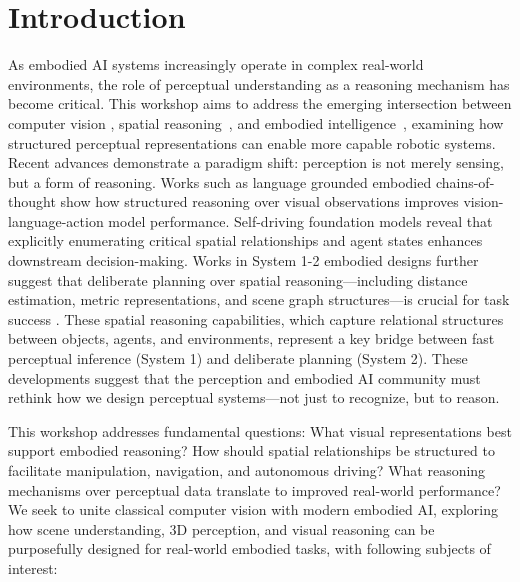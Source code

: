 \documentclass[runningheads]{llncs}
\begin{document}
\vspace{-1em}


\vspace{-1em}

\section{Introduction}

\vspace{-1em}
As embodied AI systems increasingly operate in complex real-world environments, the role of perceptual understanding as a reasoning mechanism has become critical. This workshop aims to address the emerging intersection between computer vision \cite{radford2021learning,liu2024grounding,simeoni2025dinov3,carion2025sam,chen2025sam}, spatial reasoning~\cite{qi2017pointnet++,danesi2018puzzles}, and embodied intelligence~\cite{black2024pi-0}, examining how structured perceptual representations can enable more capable robotic systems.
Recent advances demonstrate a paradigm shift: perception is not merely sensing, but a form of reasoning. Works such as language grounded embodied chains-of-thought \cite{saycan2022arxiv,Zawalski24-ecot,Chen25-ecot-lite,huang2025thinkact} show how structured reasoning over visual observations improves vision-language-action \cite{kim24openvla,black2024pi-0,bjorck2025gr00t,intelligence2025pi} model performance. Self-driving foundation models \cite{hwang2024emma,nvidia2025alpamayor1bridgingreasoningaction} reveal that explicitly enumerating critical spatial relationships and agent states enhances downstream decision-making. Works in System 1-2 embodied designs further suggest that deliberate planning over spatial reasoning—including distance estimation, metric representations, and scene graph structures—is crucial for task success \cite{posner2019robotsthinking,li2025system}. These spatial reasoning capabilities, which capture relational structures between objects, agents, and environments, represent a key bridge between fast perceptual inference (System 1) and deliberate planning (System 2). These developments suggest that the perception and embodied AI community must rethink how we design perceptual systems—not just to recognize, but to reason.

This workshop addresses fundamental questions: What visual representations best support embodied reasoning? How should spatial relationships be structured to facilitate manipulation, navigation, and autonomous driving? What reasoning mechanisms over perceptual data translate to improved real-world performance? We seek to unite classical computer vision with modern embodied AI, exploring how scene understanding, 3D perception, and visual reasoning can be purposefully designed for real-world embodied tasks, with following subjects of interest:
\end{document}
